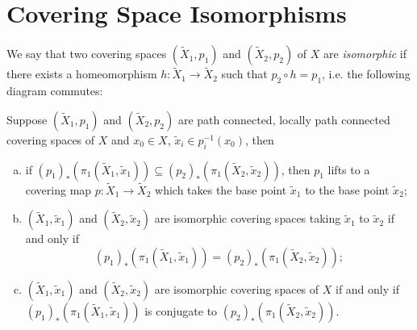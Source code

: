 \section{Covering Space Isomorphisms}

\begin{definition}
  We say that two covering spaces $(\widetilde{X}_1, p_1)$ and
  $(\widetilde{X}_2, p_2)$ of $X$ are \emph{isomorphic}
  if there exists a homeomorphism $h : \widetilde{X}_1 \to \widetilde{X}_2$
  such that $p_2 \circ h = p_1$, i.e. the following
  diagram commutes:
  \begin{center}
  \end{center}
\end{definition}

\begin{corollary}\label{cor:corollary-25}
  Suppose $(\widetilde{X}_1, p_1)$ and $(\widetilde{X}_2, p_2)$ are
  path connected, locally path connected covering spaces
  of $X$ and $x_0 \in X$, $\widetilde{x}_i \in p_i^{-1}(x_0)$,
  then
  \begin{enumerate}[(a)]
    \item if $(p_1)_*(\pi_1(\widetilde{X}_1, \widetilde{x}_1)) \subseteq
      (p_2)_*(\pi_1(\widetilde{X}_2, \widetilde{x}_2))$, then
      $p_1$ lifts to a covering map
      $p : \widetilde{X}_1 \to \widetilde{X}_2$ which takes
      the base point $\widetilde{x}_1$ to the
      base point $\widetilde{x}_2$;
    \item $(\widetilde{X}_1, \widetilde{x}_1)$ and
      $(\widetilde{X}_2, \widetilde{x}_2)$ are isomorphic
      covering spaces taking
      $\widetilde{x}_1$ to $\widetilde{x}_2$ if and only if
      \[
        (p_1)_*(\pi_1(\widetilde{X}_1, \widetilde{x}_1)) =
        (p_2)_*(\pi_1(\widetilde{X}_2, \widetilde{x}_2));
      \]
    \item $(\widetilde{X}_1, \widetilde{x}_1)$ and
      $(\widetilde{X}_2, \widetilde{x}_2)$ are isomorphic
      covering spaces of $X$ if and only if
      $(p_1)_*(\pi_1(\widetilde{X}_1, \widetilde{x}_1))$
      is conjugate to
      $(p_2)_*(\pi_1(\widetilde{X}_2, \widetilde{x}_2))$.
  \end{enumerate}
\end{corollary}

